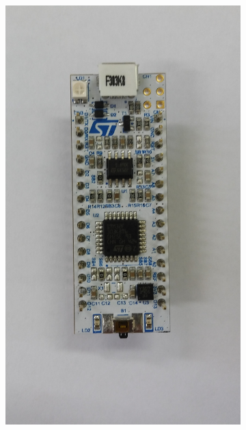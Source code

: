 \begin{frame}
\begin{figure}[noframenumbering]
\begin{subfigure}[b]{0.2\textwidth}
         \includegraphics[width=\textwidth,height=0.3\textheight,keepaspectratio]{Figuras/nucleo.jpg}
         \caption{\centering \label{fig:Posicao1}}
     \end{subfigure}
     ~
     \pause
     \begin{subfigure}[b]{0.2\textwidth}
 	\centering

\end{subfigure}
\end{figure}
\end{frame}
